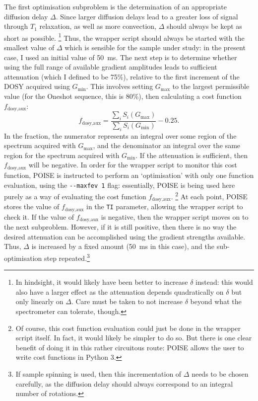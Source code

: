 The first optimisation subproblem is the determination of an appropriate diffusion delay $\Delta$.
Since larger diffusion delays lead to a greater loss of signal through $T_1$ relaxation, as well as more convection\autocite{Swan2015JMR}, $\Delta$ should always be kept as short as possible.%
\footnote{In hindsight, it would likely have been better to increase $\delta$ instead: this would also have a larger effect as the attenuation depends quadratically on $\delta$ but only linearly on $\Delta$. Care must be taken to not increase $\delta$ beyond what the spectrometer can tolerate, though.}
Thus, the wrapper script should always be started with the smallest value of $\Delta$ which is sensible for the sample under study: in the present case, I used an initial value of \qty{50}{\ms}.
The next step is to determine whether using the full range of available gradient amplitudes leads to sufficient attenuation (which I defined to be 75\%), relative to the first increment of the DOSY acquired using $G_\text{min}$.
This involves setting $G_\text{max}$ to the largest permissible value (for the Oneshot sequence, this is 80\%), then calculating a cost function $f_\text{dosy,aux}$:
\begin{equation}
    \label{eq:dosy_aux_cf}
    f_\text{dosy,aux} = \frac{\sum_i S_i(G_\text{max})}{\sum_i S_i(G_\text{min})} - 0.25.
\end{equation}
In the fraction, the numerator represents an integral over some region of the spectrum acquired with $G_\text{max}$, and the denominator an integral over the same region for the spectrum acquired with $G_\text{min}$.
If the attenuation is sufficient, then $f_\text{dosy,aux}$ will be negative.
In order for the wrapper script to monitor this cost function, POISE is instructed to perform an `optimisation' with only one function evaluation, using the \texttt{-\phantom{}-maxfev 1} flag: essentially, POISE is being used here purely as a way of evaluating the cost function $f_\text{dosy,aux}$.%
\footnote{Of course, this cost function evaluation could just be done in the wrapper script itself. In fact, it would likely be simpler to do so. But there is one clear benefit of doing it in this rather circuitous route: POISE allows the user to write cost functions in Python 3.}
At each point, POISE stores the value of $f_\text{dosy,aux}$ in the \texttt{TI} parameter, allowing the wrapper script to check it.
If the value of $f_\text{dosy,aux}$ is negative, then the wrapper script moves on to the next subproblem.
However, if it is still positive, then there is no way the desired attenuation can be accomplished using the gradient strengths available.
Thus, $\Delta$ is increased by a fixed amount (\qty{50}{\ms} in this case), and the sub-optimisation step repeated.\footnote{If sample spinning is used, then this incrementation of $\Delta$ needs to be chosen carefully, as the diffusion delay should always correspond to an integral number of rotations.}

